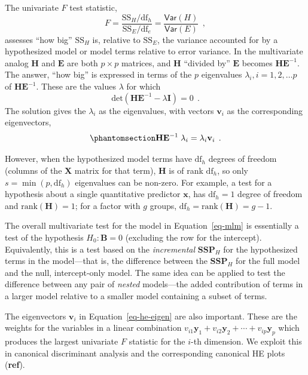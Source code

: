 \documentclass[
  letterpaper,
  10pt,
  krantz2]{krantz}
\begin{document}
{The univariate \(F\) test statistic,
\[F = \frac{\text{SS}_H/\text{df}_h}{\text{SS}_E/\text{df}_e} = \frac{\mathsf{Var}(H)}{\mathsf{Var}(E)} \:\: ,
\] assesses ``how big'' \(\text{SS}_H\) is, relative to \(\text{SS}_E\),
the variance accounted for by a hypothesized model or model terms
relative to error variance. In the multivariate analog \(\mathbf{H}\)
and \(\mathbf{E}\) are both \(p \times p\) matrices, and \(\mathbf{H}\)
``divided by'' \(\mathbf{E}\) becomes \(\mathbf{H}\mathbf{E}^{-1}\). The
answer, ``how big'' is expressed in terms of the \(p\) eigenvalues
\(\lambda_i, i = 1, 2, \dots p\) of \(\mathbf{H}\mathbf{E}^{-1}\). These
are the values \(\lambda\) for which \[
\mathrm{det}(\mathbf{H}\mathbf{E}^{-1} - \lambda \mathbf{I}) = 0 \:\: .
\] The solution gives the \(\lambda_i\) as the eigenvalues, with vectors
\(\mathbf{v}_i\) as the corresponding eigenvectors,
\begin{equation}\phantomsection\label{eq-he-eigen}{
\mathbf{H}\mathbf{E}^{-1} \; \lambda_i = \lambda_i \mathbf{v}_i \:\: .
}\end{equation}

However, when the hypothesized model terms have \(\text{df}_h\) degrees
of freedom (columns of the \(\mathbf{X}\) matrix for that term),
\(\mathbf{H}\) is of rank \(\text{df}_h\), so only
\(s=\min(p, \text{df}_h)\) eigenvalues can be non-zero. For example, a
test for a hypothesis about a single quantitative predictor
\(\mathbf{x}\), has \(\text{df}_h = 1\) degree of freedom and
\(\mathrm{rank} (\mathbf{H}) = 1\); for a factor with \(g\) groups,
\(\text{df}_h = \mathrm{rank} (\mathbf{H}) = g-1\).

The overall multivariate test for the model in Equation~\ref{eq-mlm} is
essentially a test of the hypothesis \(H_0: \mathbf{B} = 0\) (excluding
the row for the intercept). Equivalently, this is a test based on the
\emph{incremental} \(\mathbf{SSP}_{H}\) for the hypothesized terms in
the model---that is, the difference between the \(\mathbf{SSP}_{H}\) for
the full model and the null, intercept-only model. The same idea can be
applied to test the difference between any pair of \emph{nested}
models---the added contribution of terms in a larger model relative to a
smaller model containing a subset of terms.

The eigenvectors \(\mathbf{v}_i\) in Equation~\ref{eq-he-eigen} are also
important. These are the weights for the variables in a linear
combination
\(v_{i1} \mathbf{y}_1 + v_{i2} \mathbf{y}_2 + \cdots + v_{ip} \mathbf{y}_p\)
which produces the largest univariate \(F\) statistic for the \(i\)-th
dimension. We exploit this in canonical discriminant analysis and the
corresponding canonical HE plots (\textbf{ref}).

}
\end{document}
